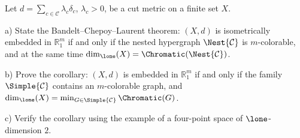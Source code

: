 \documentclass[a4paper,12pt]{report}
\begin{document}
\begin{task}
Let $d=\sum_{c\in\mathcal C}\lambda_c\delta_c$, $\lambda_c>0$, be a cut metric on a finite set $X$.

\textup{a)} State the Bandelt--Chepoy--Laurent theorem\textup{:} $(X,d)$ is isometrically embedded in $\mathbb R^m_1$ if and only if the nested hypergraph $\Nest{\mathcal C}$ is $m$-colorable, and at the same time $\dim_{\lone}(X)=\Chromatic(\Nest{\mathcal C})$.

\textup{b)} Prove the corollary\textup{:} $(X,d)$ is embedded in $\mathbb R^m_1$ if and only if the family $\Simple{\mathcal C}$ contains an $m$-colorable graph, and $\dim_{\lone}(X)=\min_{G\in\Simple{\mathcal C}}\Chromatic(G)$.

\textup{c)} Verify the corollary using the example of a four-point space of $\lone$-dimension $2$.

\end{task}
\end{document}
